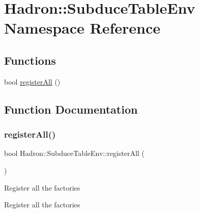 \hypertarget{namespaceHadron_1_1SubduceTableEnv}{}\section{Hadron\+:\+:Subduce\+Table\+Env Namespace Reference}
\label{namespaceHadron_1_1SubduceTableEnv}
\subsection*{Functions}
\begin{DoxyCompactItemize}
\item 
bool \mbox{\hyperlink{namespaceHadron_1_1SubduceTableEnv_a168dd05273b8d8f0ca1cfb57fbe63e23}{register\+All}} ()
\end{DoxyCompactItemize}


\subsection{Function Documentation}
\mbox{\label{namespaceHadron_1_1SubduceTableEnv_a168dd05273b8d8f0ca1cfb57fbe63e23}} 
\subsubsection{\texorpdfstring{registerAll()}{registerAll()}}
{\footnotesize\ttfamily bool Hadron\+::\+Subduce\+Table\+Env\+::register\+All (\begin{DoxyParamCaption}{ }\end{DoxyParamCaption})}

Register all the factories

Register all the factories

